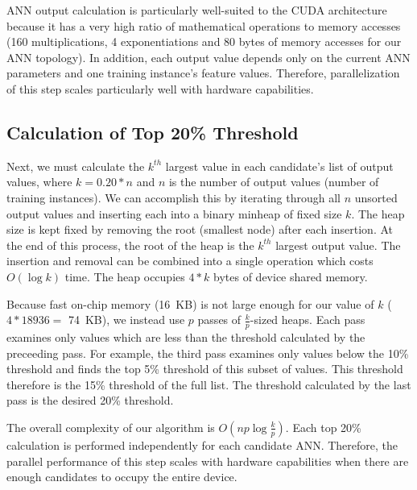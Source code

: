 \documentclass[letterpaper]{jpconf}       %
\begin{document}
ANN output calculation is particularly well-suited to the CUDA architecture because it has a very high ratio of mathematical operations to memory accesses (160 multiplications, 4 exponentiations and 80 bytes of memory accesses for our ANN topology). In addition, each output value depends only on the current ANN parameters and one training instance's feature values. Therefore, parallelization of this step scales particularly well with hardware capabilities.

\subsection{Calculation of Top 20\% Threshold} \label{top20}
Next, we must calculate the $k^{th}$ largest value in each candidate's list of output values, where $k = 0.20 * n$ and $n$ is the number of output values (number of training instances). We can accomplish this by iterating through all $n$ unsorted output values and inserting each into a binary minheap of fixed size $k$. The heap size is kept fixed by removing the root (smallest node) after each insertion. At the end of this process, the root of the heap is the $k^{th}$ largest output value. The insertion and removal can be combined into a single operation which costs $O(\log k)$ time. The heap occupies $4 * k$ bytes of device shared memory.

Because fast on-chip memory (16~KB) is not large enough for our value of $k$ ($4 * 18936 =$ 74~KB), we instead use $p$ passes of $\frac{k}{p}$-sized heaps. Each pass examines only values which are less than the threshold calculated by the preceeding pass. For example, the third pass examines only values below the 10\% threshold and finds the top 5\% threshold of this subset of values. This threshold therefore is the 15\% threshold of the full list. The threshold calculated by the last pass is the desired 20\% threshold.

The overall complexity of our algorithm is $O(np \log \frac{k}{p})$. Each top 20\% calculation is performed independently for each candidate ANN. Therefore, the parallel performance of this step scales with hardware capabilities when there are enough candidates to occupy the entire device.

\end{document}

